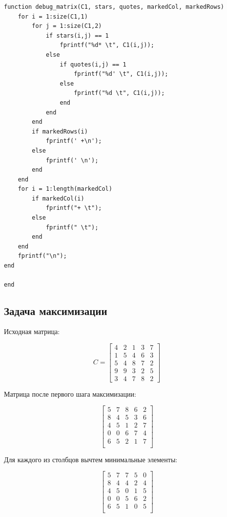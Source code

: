 \documentclass[a4paper,14pt]{article}
\begin{document}
\begin{lstlisting}[label=some-code,caption=Листинг программы]
% Функция вывода матрицы с 0*, 0'
function debug_matrix(C1, stars, quotes, markedCol, markedRows)
    for i = 1:size(C1,1)
        for j = 1:size(C1,2)
            if stars(i,j) == 1
                fprintf("%d* \t", C1(i,j));
            else
                if quotes(i,j) == 1
                    fprintf("%d' \t", C1(i,j));
                else
                    fprintf("%d \t", C1(i,j));
                end
            end
        end
        if markedRows(i)
            fprintf(' +\n');
        else
            fprintf(' \n');
        end
    end
    for i = 1:length(markedCol)
        if markedCol(i)
            fprintf("+ \t");
        else
            fprintf(" \t");
        end
    end
    fprintf("\n");
end

end
\end{lstlisting}

\subsection{Задача максимизации}

Исходная матрица:

\begin{equation} C=
\begin{bmatrix}
4 & 2 & 1 & 3 & 7\\
1 & 5 & 4 & 6 & 3\\
5 & 4 & 8 & 7 & 2\\
9 & 9 & 3 & 2 & 5\\
3 & 4 & 7 & 8 & 2
\end{bmatrix}
\end{equation}

Матрица после первого шага максимизации:

\begin{equation}
\begin{bmatrix}
     5 &  7  & 8  & 6  & 2\\
     8 &  4 &  5 &  3 &  6\\
     4  & 5  & 1 &  2 &  7\\
     0  & 0 &  6  & 7 &  4\\
     6 &  5 &  2 &  1 &  7\\
\end{bmatrix}
\end{equation}

Для каждого из столбцов вычтем минимальные элементы:

\begin{equation}
\begin{bmatrix}
     5  &   7  &   7  &   5  &   0\\
8  &   4  &   4  &   2  &   4\\
4  &   5  &   0  &   1  &   5\\
0  &   0  &   5  &   6  &   2\\
6  &   5  &   1  &   0  &   5\\
\end{bmatrix}
\end{equation}
\end{document}
